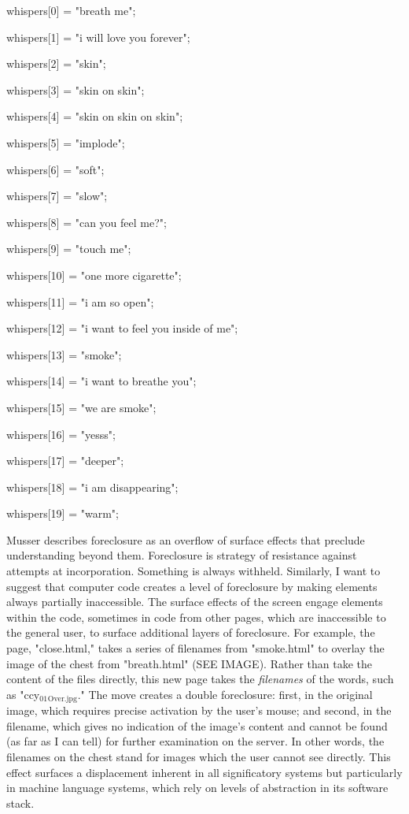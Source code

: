 \documentclass[11pt]{article}
\begin{document}
\begin{enumerate}
\begin{SOURCE}
whispers[0] = "breath me";

whispers[1] = "i will love you forever";

whispers[2] = "skin";

whispers[3] = "skin on skin";

whispers[4] = "skin on skin on skin";

whispers[5] = "implode";

whispers[6] = "soft";

whispers[7] = "slow";

whispers[8] = "can you feel me?";

whispers[9] = "touch me";

whispers[10] = "one more cigarette";

whispers[11] = "i am so open";

whispers[12] = "i want to feel you inside of me";

whispers[13] = "smoke";

whispers[14] = "i want to breathe you";

whispers[15] = "we are smoke";

whispers[16] = "yesss";

whispers[17] = "deeper";

whispers[18] = "i am disappearing";

whispers[19] = "warm";
\end{SOURCE}

Musser describes foreclosure as an overflow of surface effects that
preclude understanding beyond them. Foreclosure is strategy of
resistance against attempts at incorporation. Something is always
withheld. Similarly, I want to suggest that computer code creates a
level of foreclosure by making elements always partially
inaccessible. The surface effects of the screen engage elements within
the code, sometimes in code from other pages, which are inaccessible
to the general user, to surface additional layers of foreclosure. For
example, the page, "close.html," takes a series of filenames from
"smoke.html" to overlay the image of the chest from "breath.html" (SEE
IMAGE). Rather than take the content of the files directly, this new
page takes the \emph{filenames} of the words, such as "ccy\(_{\text{01}}\)\(_{\text{Over.jpg}}\)."
The move creates a double foreclosure: first, in the original image,
which requires precise activation by the user's mouse; and second, in
the filename, which gives no indication of the image's content and
cannot be found (as far as I can tell) for further examination on the
server. In other words, the filenames on the chest stand for images
which the user cannot see directly. This effect surfaces a
displacement inherent in all significatory systems but particularly in
machine language systems, which rely on levels of abstraction in its
software stack.


\end{enumerate}
\end{document}
